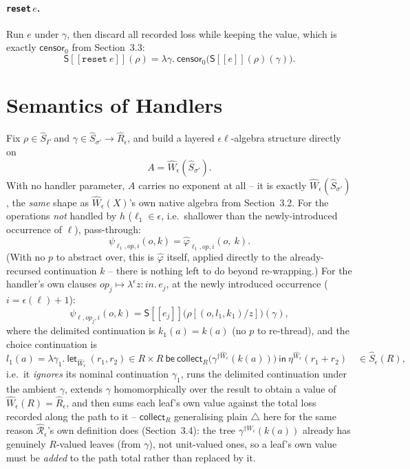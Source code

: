 \documentclass[11pt]{article}
\theoremstyle{plain}
\newcommand{\Ssem}[1]{\mathsf{S}[\![#1]\!]}
\newcommand{\Wm}[1]{\widehat{W}_{#1}}
\newcommand{\Rm}[1]{\widehat{R}_{#1}}
\newcommand{\Sm}[1]{\widehat{S}_{#1}}
\newcommand{\eps}{\epsilon}
\newcommand{\dg}[1]{^{\dagger #1}}
\newcommand{\op}{\mathit{op}}
\newcommand{\censor}{\mathsf{censor}_0}
\newcommand{\collect}{\triangle}
\newcommand{\collectX}[1]{\mathsf{collect}_{#1}}
\newcommand{\Rx}[1]{\widehat{\mathcal R}_{#1}}
\begin{document}
\paragraph{\texttt{reset}\,$e$.} Run $e$ under $\gamma$, then discard all recorded loss
while keeping the value, which is exactly $\censor$ from Section~3.3:
\[
  \Ssem{\mathtt{reset}\ e}(\rho) = \lambda\gamma.\ \censor\big(\Ssem{e}(\rho)(\gamma)\big).
\]

\section{Semantics of Handlers}

Fix $\rho\in\Sm\Gamma$ and $\gamma\in\Sm{\sigma'}\to\Rm\eps$, and build a layered
$\eps\ell$-algebra structure directly on
\[
  A = \Wm\eps(\Sm{\sigma'}).
\]
With no handler parameter, $A$ carries no exponent at all -- it is exactly
$\Wm\eps(\Sm{\sigma'})$, the \emph{same} shape as $\Wm\eps(X)$'s own native algebra from
Section~3.2. For the operations \emph{not} handled by $h$ ($\ell_1\in\eps$, i.e.\ shallower
than the newly-introduced occurrence of $\ell$), pass-through:
\[
  \psi_{\ell_1,\op,i}(o,k) = \widehat\varphi_{\ell_1,\op,i}(o,\ k).
\]
(With no $p$ to abstract over, this is $\widehat\varphi$ itself, applied directly to the
already-recursed continuation $k$ -- there is nothing left to do beyond re-wrapping.) For the
handler's own clauses $\op_j\mapsto\lambda^\eps z\!:\!\mathit{in}.\,e_j$, at the newly
introduced occurrence ($i = \eps(\ell)+1$):
\[
  \psi_{\ell,\op_j,i}(o,k) = \Ssem{e_j}\big(\rho[(o,l_1,k_1)/z]\big)(\gamma),
\]
where the delimited continuation is $k_1(a) = k(a)$ (no $p$ to re-thread), and the choice
continuation is
\[
  l_1(a) = \lambda\gamma_1.\ \mathsf{let}_{\Wm\eps}\ (r_1,r_2)\in R\times R\ \mathsf{be}\
    \mathsf{collect}_R\big(\gamma\dg{\Wm\eps}(k(a))\big)\ \mathsf{in}\ \eta^{\Wm\eps}(r_1+r_2)
  \quad \in \widehat S_\eps(R),
\]
i.e.\ it \emph{ignores} its nominal continuation $\gamma_1$, runs the delimited
continuation under the ambient $\gamma$, extends $\gamma$ homomorphically over the result
to obtain a value of $\Wm\eps(R)=\Rm\eps$, and then sums each leaf's own value against the
total loss recorded along the path to it -- $\collectX R$ generalising plain $\collect$
here for the same reason $\Rx\eps$'s own definition does (Section~3.4): the tree
$\gamma\dg{\Wm\eps}(k(a))$ already has genuinely $R$-valued leaves (from $\gamma$), not
unit-valued ones, so a leaf's own value must be \emph{added} to the path total rather than
replaced by it.
\end{document}
